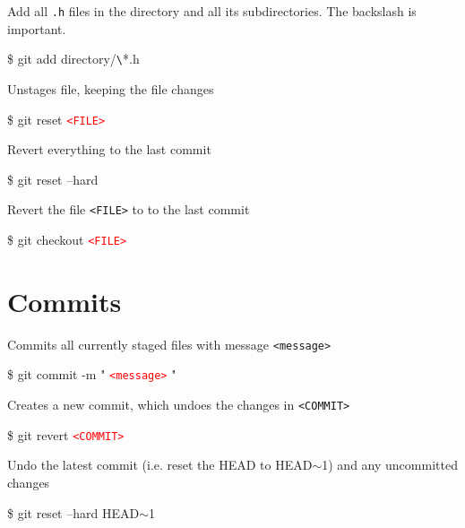 \documentclass[10pt,a4paper]{article}
\newenvironment{cheatentry}{%
    \noindent%
    \begin{minipage}{\columnwidth}%
    \small%
    \noindent%
}{%
    \end{minipage}%
}
\newenvironment{cheatcmde}{%
    \noindent%
    \begin{cmdbox}%
    \ttfamily\fontseries{b}\selectfont\large%
}{%
    \end{cmdbox}%
}
\newcommand{\entrysep}{\vspace{1em}}
\newcommand{\cheatcmd}[1]{%
    \noindent\begin{cmdbox}{\large\ttfamily\fontseries{b}\selectfont #1}\end{cmdbox}
}
\newcommand{\cheatmetavar}[1]{%
    \textcolor{red}{\texttt{\textless{}#1\textgreater{}}}%
}
\newcommand{\cheatmetavarref}[1]{%
    {\texttt{\textless{}#1\textgreater{}}}%
}
\newcommand{\HEADP}[1][]{HEAD$\sim$#1}
\begin{document}
\begin{multicols}{4}
\begin{cheatentry}%
Add all \texttt{.h} files in the directory and all its subdirectories. The backslash is important.
\begin{cheatcmde}%
\$ git add directory/\verb|\|*.h
\end{cheatcmde}%
\end{cheatentry}

\entrysep{}%

\begin{cheatentry}%
Unstages file, keeping the file changes
\cheatcmd{\$ git reset \cheatmetavar{FILE}}
\end{cheatentry}

\entrysep{}%

\begin{cheatentry}%
Revert everything to the last commit
\cheatcmd{\$ git reset --hard}
\end{cheatentry}

\entrysep{}%

\begin{cheatentry}%
Revert the file \cheatmetavarref{FILE} to to the last commit
\cheatcmd{\$ git checkout \cheatmetavar{FILE}}
\end{cheatentry}

\section{Commits}

\begin{cheatentry}%
Commits all currently staged files with message \cheatmetavarref{message}
\cheatcmd{\$ git commit -m "\cheatmetavar{message}"}
\end{cheatentry}

\entrysep{}%

\begin{cheatentry}%
Creates a new commit, which undoes the changes in \cheatmetavarref{COMMIT}
\cheatcmd{\$ git revert \cheatmetavar{COMMIT}}
\end{cheatentry}

\entrysep{}%

\begin{cheatentry}%
Undo the latest commit (i.e. reset the HEAD to HEAD$\sim$1) and any uncommitted changes
\cheatcmd{\$ git reset --hard \HEADP[1]}
\end{cheatentry}

\entrysep{}%


\end{multicols}
\end{document}

